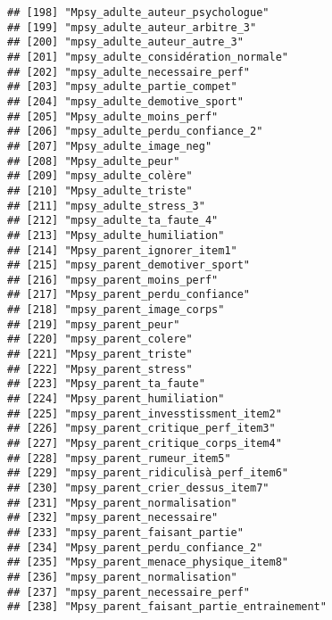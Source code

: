 \documentclass[
]{article}
\begin{document}
\begin{verbatim}
## [198] "Mpsy_adulte_auteur_psychologue"                      
## [199] "mpsy_adulte_auteur_arbitre_3"                        
## [200] "mpsy_adulte_auteur_autre_3"                          
## [201] "mpsy_adulte_considération_normale"                   
## [202] "mpsy_adulte_necessaire_perf"                         
## [203] "mpsy_adulte_partie_compet"                           
## [204] "mpsy_adulte_demotive_sport"                          
## [205] "Mpsy_adulte_moins_perf"                              
## [206] "mpsy_adulte_perdu_confiance_2"                       
## [207] "Mpsy_adulte_image_neg"                               
## [208] "Mpsy_adulte_peur"                                    
## [209] "mpsy_adulte_colère"                                  
## [210] "Mpsy_adulte_triste"                                  
## [211] "mpsy_adulte_stress_3"                                
## [212] "mpsy_adulte_ta_faute_4"                              
## [213] "Mpsy_adulte_humiliation"                             
## [214] "Mpsy_parent_ignorer_item1"                           
## [215] "mpsy_parent_demotiver_sport"                         
## [216] "mpsy_parent_moins_perf"                              
## [217] "Mpsy_parent_perdu_confiance"                         
## [218] "mpsy_parent_image_corps"                             
## [219] "mpsy_parent_peur"                                    
## [220] "mpsy_parent_colere"                                  
## [221] "Mpsy_parent_triste"                                  
## [222] "Mpsy_parent_stress"                                  
## [223] "Mpsy_parent_ta_faute"                                
## [224] "Mpsy_parent_humiliation"                             
## [225] "mpsy_parent_invesstissment_item2"                    
## [226] "mpsy_parent_critique_perf_item3"                     
## [227] "Mpsy_parent_critique_corps_item4"                    
## [228] "mpsy_parent_rumeur_item5"                            
## [229] "mpsy_parent_ridiculisà_perf_item6"                   
## [230] "mpsy_parent_crier_dessus_item7"                      
## [231] "Mpsy_parent_normalisation"                           
## [232] "mpsy_parent_necessaire"                              
## [233] "mpsy_parent_faisant_partie"                          
## [234] "Mpsy_parent_perdu_confiance_2"                       
## [235] "Mpsy_parent_menace_physique_item8"                   
## [236] "mpsy_parent_normalisation"                           
## [237] "mpsy_parent_necessaire_perf"                         
## [238] "Mpsy_parent_faisant_partie_entrainement"             

\end{verbatim}
\end{document}
